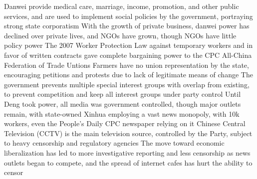\documentclass[11 pt, twoside]{article}
\newenvironment{outline*}
{
	\begin{outline}[enumerate]
	}
	{\end{outline}
}
\begin{document}
\begin{outline*}
\2 Danwei provide medical care, marriage, income, promotion, and other public services, and are used to implement social policies by the government, portraying strong state corporatism
\2 With the growth of private business, danwei power has declined over private lives, and NGOs have grown, though NGOs have little policy power
\2 The 2007 Worker Protection Law against temporary workers and in favor of written contracts gave complete bargaining power to the CPC All-China Federation of Trade Untions
\2 Farmers have no union representation by the state, encouraging petitions and protests due to lack of legitimate means of change
\2 The government prevents multiple special interest groups with overlap from existing, to prevent competition and keep all interest groups under party control
\1 Until Deng took power, all media was government controlled, though major outlets remain, with state-owned Xinhua employing a vast news monopoly,  with 10k workers, even the People's Daily CPC newspaper relying on it
\2 Chinese Central Television (CCTV) is the main television source, controlled by the Party, subject to heavy censorship and regulatory agencies
\2 The move toward economic liberalization has led to more investigative reporting and less censorship as news outlets began to compete, and the spread of internet cafes has hurt the ability to censor
\end{outline*}
\end{document}
